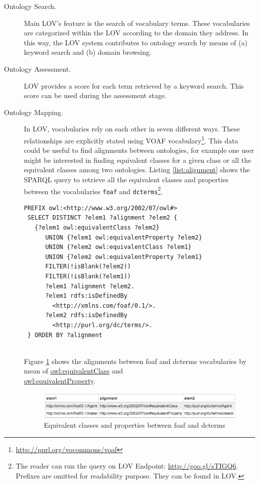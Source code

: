 \documentclass{iosart2c}
\begin{document}
\begin{description}

 \item [Ontology Search.] Main LOV's feature is the search of vocabulary terms. These vocabularies are categorized within the LOV according to the domain they address. In this way, the LOV system contributes to ontology search by means of (a) keyword search and (b) domain browsing.
 \item [Ontology Assessment.] LOV provides a score for each term retrieved by a keyword search. This score can be used during the assessment stage.
 \item [Ontology Mapping.] In LOV, vocabularies rely on each other in seven different ways. These relationships are explicitly stated using VOAF vocabulary\footnote{\url{http://purl.org/vocommons/voaf}}. This data could be useful to find alignments between ontologies, for example one user might be interested in finding equivalent classes for a given class or all the equivalent classes among two ontologies. Listing \ref{list:alignment} shows the SPARQL query to retrieve all the equivalent classes and properties between the vocabularies \texttt{foaf} and \texttt{dcterms}\footnote{The reader can run the query on LOV Endpoint: \url{http://goo.gl/sTIGQ6}. Prefixes are omitted for readability purpose. They can be found in LOV.}.
     
 \begin{lstlisting}[basicstyle=\tiny,float=htb,caption={SPARQL query asking for all the equivalent classes and properties between the vocabularies foaf and dcterms. },label=list:alignment, language=turtle]
 PREFIX owl:<http://www.w3.org/2002/07/owl#>
 SELECT DISTINCT ?elem1 ?alignment ?elem2 {
   {?elem1 owl:equivalentClass ?elem2}
      UNION {?elem1 owl:equivalentProperty ?elem2}
      UNION {?elem2 owl:equivalentClass ?elem1}
      UNION {?elem2 owl:equivalentProperty ?elem1}
      FILTER(!isBlank(?elem2))
      FILTER(!isBlank(?elem1))
      ?elem1 ?alignment ?elem2.
      ?elem1 rdfs:isDefinedBy 
		<http://xmlns.com/foaf/0.1/>.
      ?elem2 rdfs:isDefinedBy 
		<http://purl.org/dc/terms/>.
 } ORDER BY ?alignment
	
	\end{lstlisting}
	
	Figure \ref{fig:eqCR} shows the alignments between foaf and dcterms vocabularies by mean of \url{owl:equivalentClass} and \\ \url{owl:equivalentProperty}.
    \begin{figure}
      \centering
      \includegraphics[width=1.0\linewidth]{equivalentCandR.png}
      \caption{Equivalent classes and properties between foaf and dcterms}
      \label{fig:eqCR}
    \end{figure}
    

\end{description}
\end{document}
